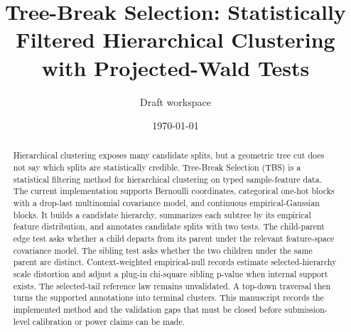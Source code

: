 \documentclass[11pt]{article}
\title{Tree-Break Selection: Statistically Filtered Hierarchical Clustering with Projected-Wald Tests}
\author{Draft workspace}
\date{\today}
\begin{document}
\maketitle

\begin{abstract}
Hierarchical clustering exposes many candidate splits, but a geometric tree
cut does not say which splits are statistically credible. Tree-Break Selection
(TBS) is a
statistical filtering method for hierarchical clustering on typed
sample-feature data. The current implementation supports Bernoulli coordinates,
categorical one-hot blocks with a drop-last multinomial covariance model, and
continuous empirical-Gaussian blocks. It builds a candidate hierarchy,
summarizes each subtree by its empirical feature distribution, and annotates
candidate splits with two tests. The child-parent edge test asks whether a child
departs from its parent under the relevant feature-space covariance model. The
sibling test asks whether the two children under the same parent are distinct.
Context-weighted empirical-null records estimate selected-hierarchy scale
distortion and adjust a plug-in chi-square sibling p-value when internal
support exists. The selected-tail reference law remains unvalidated. A top-down traversal then turns the
supported annotations into terminal clusters. This manuscript records the
implemented method and the validation gaps that must be closed before
submission-level calibration or power claims can be made.
\end{abstract}







\appendix




\end{document}
